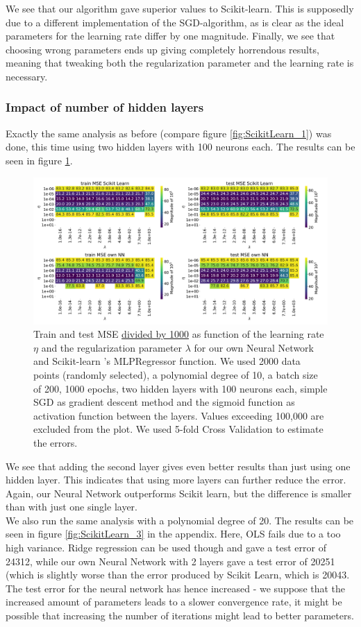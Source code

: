 \documentclass[11pt,a4paper,titlepage]{article}
\begin{document}
We see that our algorithm gave superior values to Scikit-learn. This is supposedly due to a different implementation of the SGD-algorithm, as is clear as the ideal parameters for the learning rate differ by one magnitude. Finally, we see that choosing wrong parameters ends up giving completely horrendous results, meaning that tweaking both the regularization parameter and the learning rate is necessary.
\subsubsection{Impact of number of hidden layers}
Exactly the same analysis as before (compare figure \ref{fig:ScikitLearn_1}) was done, this time using two hidden layers with 100 neurons each. The results can be seen in figure \ref{fig:ScikitLearn_2}.
\begin{figure}[H]
\centering
\includegraphics[width=1.05\textwidth]{scikit_own_2b1_logisticsgd200010.pdf}
\caption[Scikit-learn  and own FFNN with 2 layers]{Train and test MSE \underline{divided by 1000} as function of the learning rate $\eta$ and the regularization parameter $\lambda$ for our own Neural Network and Scikit-learn 's MLPRegressor function. We used 2000 data points (randomly selected), a polynomial degree of 10, a batch size of 200, 1000 epochs, two hidden layers with 100 neurons each, simple SGD as gradient descent method and the sigmoid function as activation function between the layers. Values exceeding 100,000 are excluded from the plot. We used 5-fold Cross Validation to estimate the errors.} \label{fig:ScikitLearn_2}
\end{figure}
We see that adding the second layer gives even better results than just using one hidden layer. This indicates that using more layers can further reduce the error. Again, our Neural Network outperforms Scikit learn, but the difference is smaller than with just one single layer.\\We also run the same analysis with a polynomial degree of 20. The results can be seen in figure \ref{fig:ScikitLearn_3} in the appendix. Here, OLS fails due to a too high variance. Ridge regression can be used though and gave a test error of 24312, while our own Neural Network with 2 layers gave a test error of 20251 (which is slightly worse than the error produced by Scikit Learn, which is 20043. The test error for the neural network has hence increased - we suppose that the increased amount of parameters leads to a slower convergence rate, it might be possible that increasing the number of iterations might lead to better parameters. 
\end{document}
